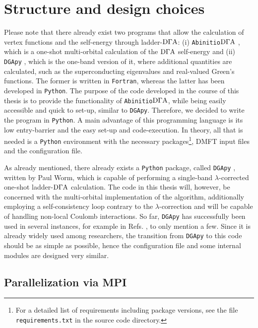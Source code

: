 \documentclass[\main/main.tex]{subfiles}
\begin{document}
\section{Structure and design choices}

Please note that there already exist two programs that allow the calculation of vertex functions and the self-energy through ladder-$\text{D}\Gamma\text{A}$: (i) \texttt{Abinitio$\text{D}\Gamma\text{A}$} \cite{Galler2019, Galler2018, Galler2017}, which is a one-shot multi-orbital calculation of the $\text{D}\Gamma\text{A}$ self-energy and (ii) \texttt{DGApy} \cite{Worm2023}, which is the one-band version of it, where additional quantities are calculated, such as the superconducting eigenvalues and real-valued Green's functions. The former is written in \texttt{Fortran}, whereas the latter has been developed in \texttt{Python}.
The purpose of the code developed in the course of this thesis is to provide the functionality of \texttt{Abinitio$\text{D}\Gamma\text{A}$}, while being easily accessible and quick to set-up, similar to \texttt{DGApy}. Therefore, we decided to write the program in \texttt{Python}. A main advantage of this programming language is its low entry-barrier and the easy set-up and code-execution. In theory, all that is needed is a \texttt{Python} environment with the necessary packages\footnote{For a detailed list of requirements including package versions, see the file \texttt{requirements.txt} in the source code directory.}, DMFT input files and the configuration file.

As already mentioned, there already exists a \texttt{Python} package, called \texttt{DGApy} \cite{Worm2023}, written by Paul Worm, which is capable of performing a single-band $\lambda$-corrected one-shot ladder-$\text{D}\Gamma\text{A}$ calculation. The code in this thesis will, however, be concerned with the multi-orbital implementation of the algorithm, additionally employing a self-consistency loop contrary to the $\lambda$-correction and will be capable of handling non-local Coulomb interactions. So far, \texttt{DGApy} has successfully been used in several instances, for example in Refs. \cite{DiCataldo2024, Worm2024}, to only mention a few. Since it is already widely used among researchers, the transition from \texttt{DGApy} to this code should be as simple as possible, hence the configuration file and some internal modules are designed very similar.

\subsection{Parallelization via MPI}
\end{document}
